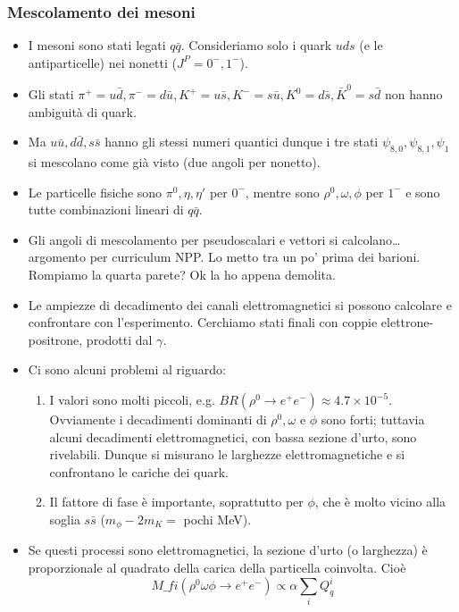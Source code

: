 \subsubsection{Mescolamento dei mesoni}
\begin{itemize}
\item I mesoni sono stati legati $q\bar q$. Consideriamo solo i quark $uds$ (e le antiparticelle) nei nonetti ($J^P=0^-,1^-$).
\item Gli stati $\pi^+=u\bar d,\pi^-=d\bar u, K^+=u\bar s, K^-=s\bar u, K^0=d\bar s, \bar K^0=s\bar d$ non hanno ambiguità di quark.
\item Ma $u\bar u, d\bar d, s\bar s$ hanno gli stessi numeri quantici dunque i tre stati $\psi_{8,0},\psi_{8,1},\psi_{1}$ si mescolano come già visto (due angoli per nonetto).
\item Le particelle fisiche sono $\pi^0,\eta,\eta'$ per $0^-$, mentre sono $\rho^0,\omega,\phi$ per $1^-$ e sono tutte combinazioni lineari di $q\bar q$.
\item Gli angoli di mescolamento per pseudoscalari e vettori si calcolano\dots argomento per curriculum NPP. Lo metto tra un po' prima dei barioni. Rompiamo la quarta parete? Ok la ho appena demolita.
\item Le ampiezze di decadimento dei canali elettromagnetici si possono calcolare e confrontare con l'esperimento. Cerchiamo stati finali con coppie elettrone-positrone, prodotti dal $\gamma$.
\item Ci sono alcuni problemi al riguardo:
\begin{enumerate}
\item I valori sono molti piccoli, e.g. $BR(\rho^0\to e^+e^-)\approx4.7\times10^{-5}$. Ovviamente i decadimenti dominanti di $\rho^0,\omega$ e $\phi$ sono forti; tuttavia alcuni decadimenti elettromagnetici, con bassa sezione d'urto, sono rivelabili. Dunque si misurano le larghezze elettromagnetiche e si confrontano le cariche dei quark.
\item Il fattore di fase è importante, soprattutto per $\phi$, che è molto vicino alla soglia $s\bar s$ ($m_\phi-2m_K=$ pochi MeV).
\end{enumerate}
\item Se questi processi sono elettromagnetici, la sezione d'urto (o larghezza) è proporzionale al quadrato della carica della particella coinvolta. Cioè
\begin{equation*}
M\_{fi}(\rho^0\omega\phi\to e^+e^-)\propto \alpha \sum_i Q_q^i
\end{equation*}

\end{itemize}
